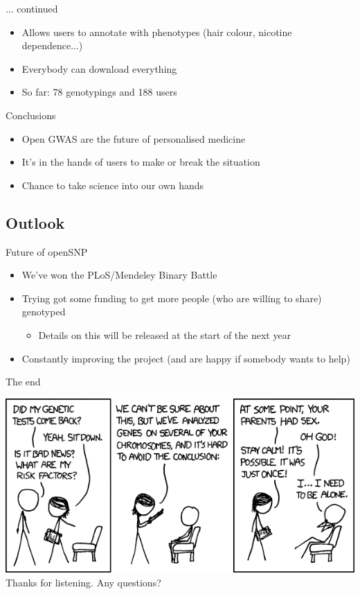 \documentclass[12pt,a4paper]{beamer}
\begin{document}
\begin{frame}{... continued}
\begin{itemize}
\item Allows users to annotate with phenotypes (hair colour, nicotine dependence...)
\pause \item Everybody can download everything
\pause \item So far: 78 genotypings and 188 users %
\end{itemize}
\end{frame}

\begin{frame}{Conclusions}
\begin{itemize}
\item Open GWAS are the future of personalised medicine
\pause \item It's in the hands of users to make or break the situation
\pause \item Chance to take science into our own hands %
\end{itemize}
\end{frame}

\subsection{Outlook}
\begin{frame}{Future of openSNP}
\begin{itemize}
\item We've won the PLoS/Mendeley Binary Battle
\pause \item Trying got some funding to get more people (who are willing to share) genotyped
\begin{itemize}
\pause \item Details on this will be released at the start of the next year
\end{itemize} 
\pause \item Constantly improving the project (and are happy if somebody wants to help)
\end{itemize}
\end{frame}

\begin{frame}{The end}
\begin{center}
\includegraphics[scale=0.5]{genetic_analysis.png} \\
Thanks for listening. Any questions?
\end{center}
\end{frame}
\end{document}
